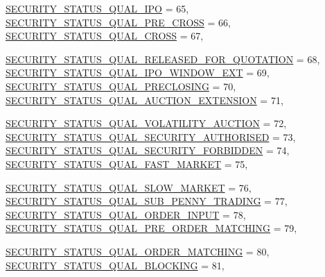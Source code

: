 \begin{CompactItemize}
\hyperlink{namespaceWombat_2de6f22c731ba94169dc24b8054862b8bd7474cd63023c374e823a6a115cbb83}{SECURITY\_\-STATUS\_\-QUAL\_\-IPO} =  65, 
\hyperlink{namespaceWombat_2de6f22c731ba94169dc24b8054862b895693792a0ae02c2ccee2dfd75353ea6}{SECURITY\_\-STATUS\_\-QUAL\_\-PRE\_\-CROSS} =  66, 
\hyperlink{namespaceWombat_2de6f22c731ba94169dc24b8054862b8793fc545364717b87029b1e72b02af00}{SECURITY\_\-STATUS\_\-QUAL\_\-CROSS} =  67, 
\par
\hyperlink{namespaceWombat_2de6f22c731ba94169dc24b8054862b8b2c20454bc32449f1f23de84fce582c6}{SECURITY\_\-STATUS\_\-QUAL\_\-RELEASED\_\-FOR\_\-QUOTATION} =  68, 
\hyperlink{namespaceWombat_2de6f22c731ba94169dc24b8054862b8deb32b72ca3e70bb9f2586c316b0a651}{SECURITY\_\-STATUS\_\-QUAL\_\-IPO\_\-WINDOW\_\-EXT} =  69, 
\hyperlink{namespaceWombat_2de6f22c731ba94169dc24b8054862b893e241e00b0740b186f371aa08808111}{SECURITY\_\-STATUS\_\-QUAL\_\-PRECLOSING} =  70, 
\hyperlink{namespaceWombat_2de6f22c731ba94169dc24b8054862b8a2155fbc4862b5e0fd2b8712dc3a74f6}{SECURITY\_\-STATUS\_\-QUAL\_\-AUCTION\_\-EXTENSION} =  71, 
\par
\hyperlink{namespaceWombat_2de6f22c731ba94169dc24b8054862b8865eda7e4bfd5323eaa64da51ab4bd12}{SECURITY\_\-STATUS\_\-QUAL\_\-VOLATILITY\_\-AUCTION} =  72, 
\hyperlink{namespaceWombat_2de6f22c731ba94169dc24b8054862b826cdad31f785302970bd03f720317b20}{SECURITY\_\-STATUS\_\-QUAL\_\-SECURITY\_\-AUTHORISED} =  73, 
\hyperlink{namespaceWombat_2de6f22c731ba94169dc24b8054862b89f9e28733662175341327442e76b5811}{SECURITY\_\-STATUS\_\-QUAL\_\-SECURITY\_\-FORBIDDEN} =  74, 
\hyperlink{namespaceWombat_2de6f22c731ba94169dc24b8054862b8772652869464b5dcb65bb999259a5277}{SECURITY\_\-STATUS\_\-QUAL\_\-FAST\_\-MARKET} =  75, 
\par
\hyperlink{namespaceWombat_2de6f22c731ba94169dc24b8054862b824138d06393a481214c6ee16dfe4d505}{SECURITY\_\-STATUS\_\-QUAL\_\-SLOW\_\-MARKET} =  76, 
\hyperlink{namespaceWombat_2de6f22c731ba94169dc24b8054862b8ea7ac315082bf16160a9c98cf978ffb5}{SECURITY\_\-STATUS\_\-QUAL\_\-SUB\_\-PENNY\_\-TRADING} =  77, 
\hyperlink{namespaceWombat_2de6f22c731ba94169dc24b8054862b8df922cc59263361e1d34ec53c728f6b6}{SECURITY\_\-STATUS\_\-QUAL\_\-ORDER\_\-INPUT} =  78, 
\hyperlink{namespaceWombat_2de6f22c731ba94169dc24b8054862b8ce58700ad7eac225bdb39d2a071a9bc9}{SECURITY\_\-STATUS\_\-QUAL\_\-PRE\_\-ORDER\_\-MATCHING} =  79, 
\par
\hyperlink{namespaceWombat_2de6f22c731ba94169dc24b8054862b8356ba0400b785de6b32fb16f4a1140f9}{SECURITY\_\-STATUS\_\-QUAL\_\-ORDER\_\-MATCHING} =  80, 
\hyperlink{namespaceWombat_2de6f22c731ba94169dc24b8054862b8256e056170b5bc57f49f2392aa77b63a}{SECURITY\_\-STATUS\_\-QUAL\_\-BLOCKING} =  81, 

\end{CompactItemize}

